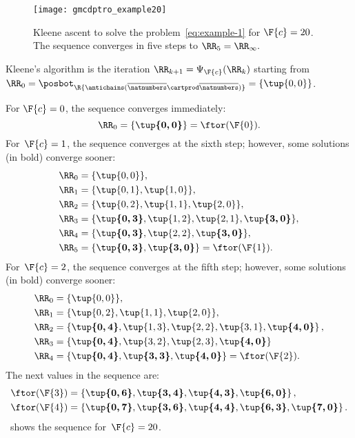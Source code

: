 \begin{figure}
    \begin{centering}
        \texttt{[image: gmcdptro\_example20]}
    \end{centering}
    \caption{Kleene ascent to solve the problem~\cref{eq:example-1} for $\F{c}=20$.
    The sequence converges in five steps to $\RR_{5}=\RR_{\infty}.$ }
    \label{fig:example24}
\end{figure}

\noindent Kleene's algorithm is the iteration $\RR_{k+1}=\Psi_{\F{c}}(\RR_{k})$
starting from $\RR_{0}=\posbot_{\R{\antichains(\overline{\natnumbers}\cartprod\overline{\natnumbers})}}=\{\tup{ 0,0} \}$.

\noindent For $\F{c}=0$, the sequence converges immediately:
\begin{equation*}
    \RR_{0}=\{\boldsymbol{\tup{ 0,0} }\}=\ftor(\F{0}).
\end{equation*}
For~$\F{c}=1$, the sequence converges at the sixth step; however, some solutions (in bold) converge sooner:
\begin{align*}
    \RR_{0} & =\{\tup{0,0} \},\\
    \RR_{1} & =\{\tup{0,1},\tup{1,0}\},\\
    \RR_{2} & =\{\tup{0,2},\tup{1,1}, \tup{2,0}\},\\
    \RR_{3} & =\{\boldsymbol{\tup{0,3}},\tup{1,2}, \tup{2,1},\boldsymbol{\tup{3,0}}\},\\
    \RR_{4} & =\{\boldsymbol{\tup{0,3}},\tup{2,2},\boldsymbol{\tup{3,0}}\},\\
    \RR_{5} & =\{\boldsymbol{\tup{0,3}},\boldsymbol{\tup{3,0}}\}=\ftor(\F{1}).
\end{align*}
For~$\F{c}=2$, the sequence converges at the fifth step; however,
some solutions (in bold) converge sooner:
\begin{align*}
    \RR_{0} & =\{\tup{ 0,0} \},\\
    \RR_{1} & =\{\tup{ 0,2} ,\tup{ 1,1} ,\tup{ 2,0} \},\\
    \RR_{2} & =\left\{ \boldsymbol{\tup{ 0,4} }, \tup{1,3}, \tup{2,2}, \tup{3,1}, \boldsymbol{\tup{ 4,0} }\right\} ,\\
    \RR_{3} & =\{\boldsymbol{\tup{0,4} },\tup{ 3,2}, \tup{2,3}, \boldsymbol{\tup{ 4,0} }\}\\
    \RR_{4} & =\{\boldsymbol{\tup{0,4} },\boldsymbol{\tup{ 3,3}},\boldsymbol{\tup{ 4,0} }\}=\ftor(\F{2}).
\end{align*}
The next values in the sequence are:
\begin{align*}
    \ftor(\F{3}) & =\left\{ \boldsymbol{\tup{ 0,6} },\boldsymbol{\tup{ 3,4} },\boldsymbol{\tup{ 4,3} },\boldsymbol{\tup{ 6,0} }\right\} ,\\
    \ftor(\F{4}) & =\left\{ \boldsymbol{\tup{ 0,7} },\boldsymbol{\tup{ 3,6} },\boldsymbol{\tup{ 4,4} },\boldsymbol{\tup{ 6,3} },\boldsymbol{\tup{ 7,0} }\right\} .
\end{align*}
~shows the sequence for~$\F{c}=20$.

